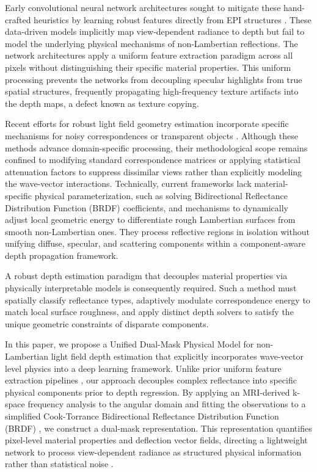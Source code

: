 \documentclass[lettersize,journal]{IEEEtran}
\begin{document}
Early convolutional neural network architectures sought to mitigate these hand-crafted heuristics by learning robust features directly from EPI structures \cite{heber2018, lyu2022}. These data-driven models implicitly map view-dependent radiance to depth but fail to model the underlying physical mechanisms of non-Lambertian reflections. The network architectures apply a uniform feature extraction paradigm across all pixels without distinguishing their specific material properties. This uniform processing prevents the networks from decoupling specular highlights from true spatial structures, frequently propagating high-frequency texture artifacts into the depth maps, a defect known as texture copying.

Recent efforts for robust light field geometry estimation incorporate specific mechanisms for noisy correspondences or transparent objects \cite{wang2023, zhang2023, li2021}. Although these methods advance domain-specific processing, their methodological scope remains confined to modifying standard correspondence matrices or applying statistical attenuation factors to suppress dissimilar views rather than explicitly modeling the wave-vector interactions. Technically, current frameworks lack material-specific physical parameterization, such as solving Bidirectional Reflectance Distribution Function (BRDF) coefficients, and mechanisms to dynamically adjust local geometric energy to differentiate rough Lambertian surfaces from smooth non-Lambertian ones. They process reflective regions in isolation without unifying diffuse, specular, and scattering components within a component-aware depth propagation framework.

A robust depth estimation paradigm that decouples material properties via physically interpretable models is consequently required. Such a method must spatially classify reflectance types, adaptively modulate correspondence energy to match local surface roughness, and apply distinct depth solvers to satisfy the unique geometric constraints of disparate components.

In this paper, we propose a Unified Dual-Mask Physical Model for non-Lambertian light field depth estimation that explicitly incorporates wave-vector level physics into a deep learning framework. Unlike prior uniform feature extraction pipelines \cite{heber2018, lyu2022}, our approach decouples complex reflectance into specific physical components prior to depth regression. By applying an MRI-derived k-space frequency analysis to the angular domain and fitting the observations to a simplified Cook-Torrance Bidirectional Reflectance Distribution Function (BRDF) \cite{blinn1977}, we construct a dual-mask representation. This representation quantifies pixel-level material properties and deflection vector fields, directing a lightweight network to process view-dependent radiance as structured physical information rather than statistical noise \cite{wang2023}. 
\end{document}
